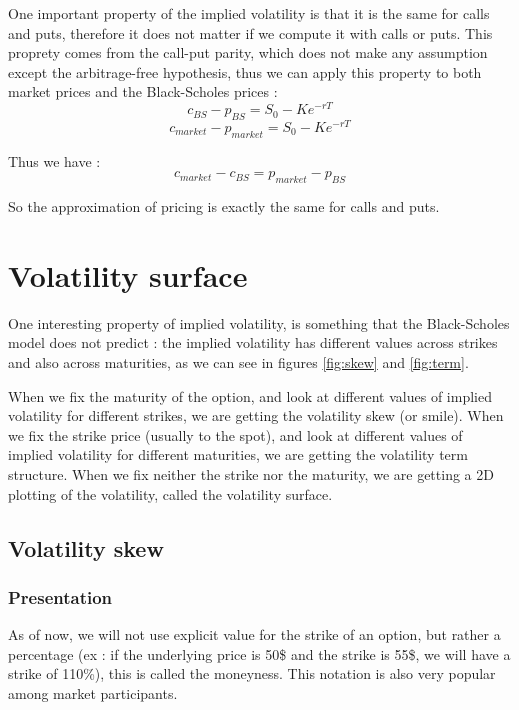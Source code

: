 \documentclass[hidelinks]{article}
\theoremstyle{definition}
\begin{document}
One important property of the implied volatility is that it is the same for calls and puts, therefore it does not matter if we compute it with calls or puts. This proprety comes from the call-put parity, which does not make any assumption except the arbitrage-free hypothesis, thus we can apply this property to both market prices and the Black-Scholes prices :
$$ c_{BS} - p_{BS} = S_0 - K e^{-rT}$$
$$c_{market} - p_{market} = S_0 - K e^{-rT}$$

Thus we have :
$$c_{market} - c_{BS} = p_{market} - p_{BS}$$

So the approximation of pricing is exactly the same for calls and puts.

\newpage
\section{Volatility surface}
One interesting property of implied volatility, is something that the Black-Scholes model does not predict : the implied volatility has different values across strikes and also across maturities, as we can see in figures \ref{fig:skew} and \ref{fig:term}.

 When we fix the maturity of the option, and look at different values of implied volatility for different strikes, we are getting the volatility skew (or smile). When we fix the strike price (usually to the spot), and look at different values of implied volatility for different maturities, we are getting the volatility term structure. When we fix neither the strike nor the maturity, we are getting a 2D plotting of the volatility, called the volatility surface.
 
\subsection{Volatility skew}

\subsubsection{Presentation}

As of now, we will not use explicit value for the strike of an option, but rather a percentage (ex : if the underlying price is 50\$ and the strike is 55\$, we will have a strike of 110\%), this is called the moneyness. This notation is also very popular among market participants. 
\end{document}
